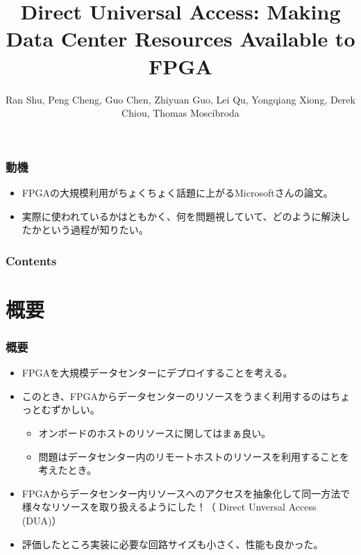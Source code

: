 \documentclass[dvipdfmx,9pt,notheorems]{beamer}
\title{Direct Universal Access: Making Data Center Resources Available to FPGA}
\author{Ran Shu\footnotemark[1], Peng Cheng\footnotemark[1], Guo Chen\footnotemark[1,2], Zhiyuan Guo\footnotemark[1,3], Lei Qu\footnotemark[1], Yongqiang Xiong\footnotemark[1], Derek Chiou\footnotemark[4], Thomas Moscibroda\footnotemark[4]}
\institute{\footnotemark[1]Microsoft Research, \footnotemark[2]Hunan University, \footnotemark[3]Beihang University, \footnotemark[4]Microsoft Azure}
\theoremstyle{definition}
\begin{document}
\begin{frame}[plain]\frametitle{}
\titlepage %
\end{frame}

\begin{frame}\frametitle{動機}
	\begin{itemize}
		\item FPGAの大規模利用がちょくちょく話題に上がるMicrosoftさんの論文。
		\item 実際に使われているかはともかく、何を問題視していて、どのように解決したかという過程が知りたい。
	\end{itemize}
\end{frame}

\begin{frame}\frametitle{Contents}
\raggedright
\tableofcontents
\end{frame}

\section{概要}
\begin{frame}\frametitle{概要}
\begin{itemize}
	\item FPGAを大規模データセンターにデプロイすることを考える。
	\item このとき、FPGAからデータセンターのリソースをうまく利用するのはちょっとむずかしい。
  	\begin{itemize}
			\item オンボードのホストのリソースに関してはまぁ良い。
  		\item	問題はデータセンター内のリモートホストのリソースを利用することを考えたとき。
  	\end{itemize}
	\item FPGAからデータセンター内リソースへのアクセスを抽象化して同一方法で様々なリソースを取り扱えるようにした！（{\color{red} Direct Unversal Access} (DUA)）
	\item 評価したところ実装に必要な回路サイズも小さく、性能も良かった。
\end{itemize}
\end{frame}


\end{document}

